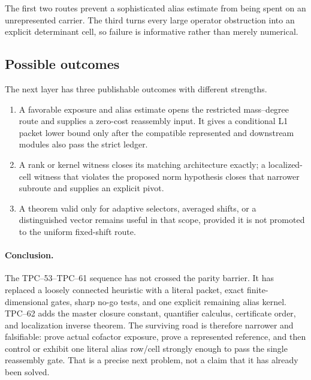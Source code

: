 The first two routes prevent a sophisticated alias estimate from being
spent on an unrepresented carrier.  The third turns every large operator
obstruction into an explicit determinant cell, so failure is informative
rather than merely numerical.

\subsection{Possible outcomes}

The next layer has three publishable outcomes with different strengths.
\begin{enumerate}[label=\textup{(\roman*)},leftmargin=3em]
 \item A favorable exposure and alias estimate opens the restricted
       mass--degree route and supplies a zero-cost reassembly input.  It
       gives a conditional L1 packet lower bound only after the compatible
       represented and downstream modules also pass the strict ledger.
 \item A rank or kernel witness closes its matching architecture exactly;
       a localized-cell witness that violates the proposed norm hypothesis
       closes that narrower subroute and supplies an explicit pivot.
 \item A theorem valid only for adaptive selectors, averaged shifts, or a
       distinguished vector remains useful in that scope, provided it is
       not promoted to the uniform fixed-shift route.
\end{enumerate}

\paragraph{Conclusion.}
The TPC--53--TPC--61 sequence has not crossed the parity barrier.  It has
replaced a loosely connected heuristic with a literal packet, exact
finite-dimensional gates, sharp no-go tests, and one explicit remaining
alias kernel.  TPC--62 adds the master closure constant, quantifier calculus,
certificate order, and localization inverse theorem.  The surviving road is
therefore narrower and falsifiable: prove actual cofactor exposure, prove a
represented reference, and then control or exhibit one literal alias
row/cell strongly enough to pass the single reassembly gate.  That is a
precise next problem, not a claim that it has already been solved.

